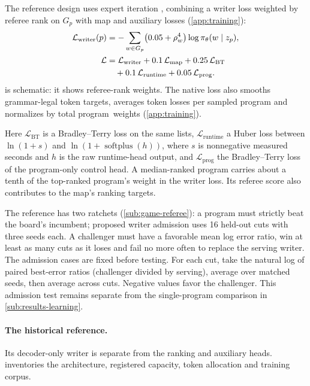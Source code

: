 The reference design uses expert iteration \citep{anthony2017expert},
combining a writer loss weighted by referee rank on $G_p$ with map and
auxiliary losses (\cref{app:training}):
\begin{align}
  \mathcal{L}_{\mathrm{writer}}(p) &= -\sum_{w\in G_p}\bigl(0.05+\rho_w^{4}\bigr)\log\pi_{\theta}(w\mid z_p),
  \label{eq:writerLoss}\\
  \mathcal{L} &= \mathcal{L}_{\mathrm{writer}} + 0.1\,\mathcal{L}_{\mathrm{map}}
  + 0.25\,\mathcal{L}_{\mathrm{BT}} \nonumber\\
  &\quad + 0.1\,\mathcal{L}_{\mathrm{runtime}} + 0.05\,\mathcal{L}_{\mathrm{prog}}.
  \label{eq:totalLoss}
\end{align}
 is schematic: it shows referee-rank weights. The native
loss also smooths grammar-legal token targets, averages token losses per
sampled program and normalizes by total \mbox{program weights}
(\cref{app:training}).

Here $\mathcal{L}_{\mathrm{BT}}$ is a Bradley--Terry loss on the same lists,
$\mathcal{L}_{\mathrm{runtime}}$ a Huber loss between $\ln(1+s)$ and
$\ln(1+\operatorname{softplus}(h))$, where $s$ is nonnegative measured
seconds and $h$ is the raw runtime-head output, and
$\mathcal{L}_{\mathrm{prog}}$ the Bradley--Terry loss of the program-only control head.
A median-ranked program carries about a tenth of the top-ranked program's
weight in the writer loss. Its referee score also contributes to the map's
ranking targets.

The reference has two ratchets (\cref{sub:game-referee}): a program must
strictly beat the board's incumbent; proposed writer admission uses 16
held-out cuts with three seeds each. A challenger must have a favorable
mean log error ratio, win at least as many cuts as it loses and fail no
more often to replace the serving writer.
%
The admission cases are fixed before testing. For each cut, take the natural
log of paired best-error ratios (challenger divided by serving), average
over matched seeds, then average across cuts. Negative values favor the
challenger. This admission test remains separate from the single-program
comparison in \cref{sub:results-learning}.

\paragraph{The historical reference.} Its decoder-only writer is separate
from the ranking and auxiliary heads.  inventories the
architecture, registered capacity, token allocation and training corpus.

